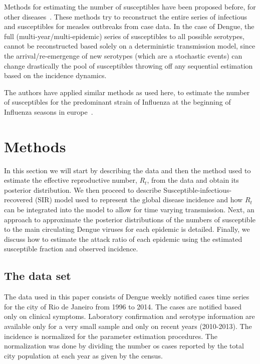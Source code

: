 Methods for estimating the  number of susceptibles have been proposed 
before, for other diseases~\cite{bjornstad_dynamics_2002, 
wallinga_reconstruction_2003}.
These methods try to reconstruct the entire 
series of infectious and susceptibles for measles 
outbreaks from case data.
In the case of Dengue, the full (multi-year/multi-epidemic)
series of susceptibles to all possible serotypes, cannot be reconstructed based 
solely on a deterministic transmission model, since the arrival/re-emergenge of 
new serotypes (which are a stochastic events) can change drastically the pool 
of susceptibles throwing off any sequential estimation based on the incidence
dynamics.

The authors have applied similar methods as used here, to estimate the number 
of susceptibles for the predominant strain of Influenza at the beginning of  
Influenza seasons in europe~\cite{pone2011}.


\section*{Methods}



In this section we will start by describing the data and then the method used 
to estimate the effective reproductive number, $R_t$, from the data and obtain 
its posterior distribution. 
We then proceed to describe Susceptible-infectious-recovered (SIR) model 
used to represent the global disease incidence and how $R_t$ can be integrated 
into the model to allow for time varying transmission. 
Next, an approach to approximate the posterior distributions 
of the numbers of susceptible to the main circulating Dengue viruses for each 
epidemic is detailed.
Finally, we discuss how to estimate the attack ratio of each 
epidemic using the estimated susceptible fraction and observed incidence.


\subsection*{The data set} 
The data used in this paper consists of  Dengue weekly notified cases time 
series for the city of Rio de Janeiro from 1996 to 2014. The cases are notified 
based only on clinical symptoms. Laboratory confirmation and serotype 
information are available only for a very small sample and only on recent 
years (2010-2013). The incidence is normalized for the parameter estimation 
procedures. The normalization was done by dividing the number os cases reported 
by the total city population at each year as given by the census.

